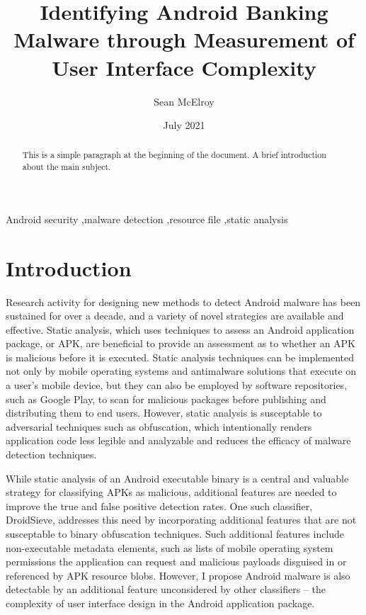 \documentclass[preprint,1p]{elsarticle}
\begin{document}
    \begin{frontmatter}

    \title{Identifying Android Banking Malware through Measurement of User Interface Complexity}
    \author[1]{Sean McElroy}

    \date{July 2021}

    \begin{abstract}
    This is a simple paragraph at the beginning of the document. A brief introduction about the main subject.
    \end{abstract}

    \begin{keyword}
    Android security \sep malware detection \sep resource file \sep static analysis
    \end{keyword}

\end{frontmatter}

\section{Introduction}
Research activity for designing new methods to detect Android malware has been sustained for over a decade, and a variety of novel strategies are available and effective.\cite{RAZGALLAH2021100358} Static analysis, which uses techniques to assess an Android application package, or APK, are beneficial to provide an assessment as to whether an APK is malicious before it is executed.  Static analysis techniques can be implemented not only by mobile operating systems and antimalware solutions that execute on a user's
mobile device, but they can also be employed by software repositories, such as Google Play, to scan for malicious packages before publishing and distributing them to end users.  However, static analysis is susceptable to adversarial techniques such as obfuscation, which intentionally renders application code less legible and analyzable and reduces the efficacy of malware detection techniques.

While static analysis of an Android executable binary is a central and valuable strategy for classifying APKs as malicious, additional features are needed to improve the true and false positive detection rates.  One such classifier, DroidSieve, addresses this need by incorporating additional features that are not susceptable to binary obfuscation techniques.\cite{10.1145/3029806.3029825} Such additional features include non-executable metadata elements, such as lists of mobile operating system permissions the application can request and malicious payloads disguised in or referenced by APK resource blobs.  However, I propose Android malware is also detectable by an additional feature unconsidered by other classifiers -- the complexity of user interface design in the Android application package.
\end{document}
